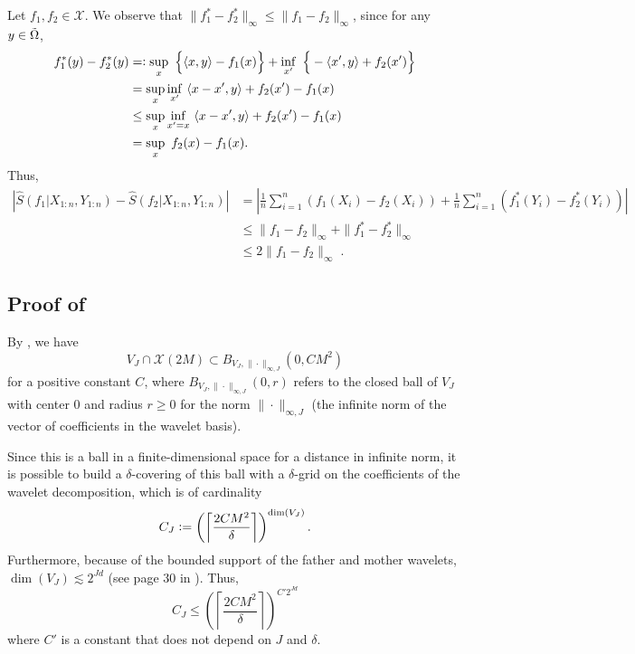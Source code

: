 \documentclass{article}
\theoremstyle{plain}
\theoremstyle{definition}
\theoremstyle{remark}
\newcommand{\eqdef}{\vcentcolon=}
\newcommand{\defeq}{=\vcentcolon}
\newcommand\p[1]{\left( {#1}\right)}
\begin{document}
Let $f_1, f_2 \in \mathcal{X}$. 
We observe that $\| f_1^* - f_2^*\|_{\infty} \leq \| f_1 - f_2\|_{\infty}$, since 
    for any $y\in \Tilde{\Omega}$,
     \begin{align*}
        f_1^*(y) - f_2^*(y) &\defeq \sup_x  ~ \Big\{\langle x, y \rangle - f_1(x) \Big\}  +  \inf_{x'} ~  \Big\{-\langle x', y \rangle + f_2(x') \Big\} \\
        &=  \sup_x \inf_{x'} ~ \langle x-x', y \rangle + f_2(x') - f_1(x)  \\
        & \leq \sup_x \inf_{x' = x} ~ \langle x-x', y \rangle + f_2(x') - f_1(x) \\
        &= \sup_x  ~ f_2(x) - f_1(x). 
    \end{align*}    
    Thus,
    \begin{equation}
        \begin{aligned}
            \left| \hat{S}(f_1 | X_{1:n}, Y_{1:n}) - \hat{S}(f_2 | X_{1:n}, Y_{1:n}) \right| 
            &=
            \left| \frac{1}{n} \sum_{i = 1}^n (f_1(X_i) - f_2(X_i)) + \frac{1}{n} \sum_{i = 1}^n (f_1^*(Y_i) - f_2^*(Y_i)) \right| \\
            &\leq \| f_1 - f_2\|_{\infty} + \| f_1^* - f_2^*\|_{\infty}\\
            &\leq 2  \| f_1 - f_2\|_{\infty} \;.
        \end{aligned}
    \end{equation}

\subsection{Proof of }
\label{proof_of_covering_cardinality}



By , we have
\begin{equation}
    V_J \cap \mathcal{X}(2M) \subset B_{V_J, \| \cdot\|_{\infty,J}}(0, C M^2)
\end{equation}
for a positive constant $C$, 
where $B_{V_J, \| \cdot\|_{\infty,J}}(0, r)$ refers to the closed ball of $V_J$ with center $0$ and radius $r \geq 0$ for the norm $\| \cdot\|_{\infty,J}$ (the infinite norm of the vector of coefficients in the wavelet basis). 

Since this is a ball in a finite-dimensional space for a distance in infinite norm, it is possible to build a $\delta$-covering of this ball with a $\delta$-grid on the coefficients of the wavelet decomposition, which is of cardinality
\begin{equation}
    C_J \eqdef \p{\left\lceil\frac{2 C M^2}{\delta} \right\rceil}^{\dim (V_J)}.
\end{equation}
Furthermore, because of the bounded support of the father and mother wavelets, $\dim (V_J) \lesssim 2^{Jd}$ (see page 30 in \cite{hutter2021minimax}). 
Thus, 
\begin{equation}
    C_J \leq \p{\left\lceil\frac{2 C M^2}{\delta} \right\rceil}^{C' 2^{Jd}}
\end{equation}
where $C'$ is a constant that does not depend on $J$ and $\delta$.
\end{document}
